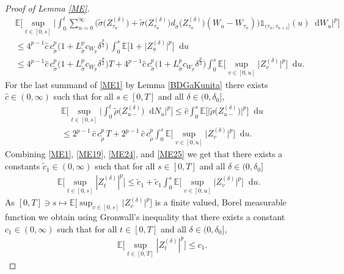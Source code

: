 \documentclass[11pt,a4paper]{article}
\numberwithin{equation}{section}
\theoremstyle{definition}
\newcommand{\E}{{\mathbb{E}}}
\newcommand{\diff}{\mathop{}\!\mathrm{d}}
\begin{document}
\begin{proof}[Proof of Lemma \ref{ME}]
\begin{equation}
\begin{aligned}
    &\E\Big[\sup_{t\in[0,s]}\Big|\int_0^t \sum_{n=0}^{\infty} \Big(\widetilde \sigma\big(Z^{(\delta)}_{\tau_{n}}\big) + \widetilde\sigma \big(Z^{(\delta)}_{\tau_n}\big) d_{\widetilde\sigma} \big(Z^{(\delta)}_{\tau_n}\big) (W_{u}-W_{\tau_n}) \Big)\mathds{1}_{(\tau_n,\tau_{n+1}]}(u) \diff W_u\Big|^p\Big]\\
    &\leq 4^{p-1} \hat c\, c_{\widetilde \sigma}^p \big( 1
    + L_{\widetilde\sigma}^p c_{W_p} \delta^{\frac{p}{2}}\big)  \, \int_0^s \E\big[ 1+ \big|Z^{(\delta)}_{\underline u}\big|^p\big]  \diff u\\
    &\leq  4^{p-1} \hat c\, c_{\widetilde \sigma}^p \big( 1
    + L_{\widetilde\sigma}^p c_{W_p} \delta^{\frac{p}{2}}\big)  T +  4^{p-1} \hat c\, c_{\widetilde \sigma}^p \big( 1
    + L_{\widetilde\sigma}^p c_{W_p} \delta^{\frac{p}{2}}\big) \int_0^s\E\Big[ \sup_{v\in[0,u]}  \big|Z^{(\delta)}_{v}\big|^p\Big]\diff u.
\end{aligned}
\end{equation}
For the last summand of \eqref{ME1} by Lemma \ref{BDGaKunita} there exists $\hat c \in(0,\infty)$ such that for all $s\in[0,T]$ and all $\delta\in(0,\delta_0]$,
\begin{equation}
    \begin{aligned}\label{ME25}
    &\E\Big[\sup_{t\in[0,s]}\Big|\int_0^t \widetilde \rho\big(Z^{(\delta)}_{u-}\big)\diff N_u\Big|^p\Big] 
    \leq \hat c \int_0^s \E\Big[\big| \widetilde \rho\big(Z^{(\delta)}_{u-}\big)\big|^p\Big]\diff u\\
    &\leq 2^{p-1} \,\hat c\, c_{\widetilde\rho}^p\, T + 2^{p-1} \,\hat c\, c_{\widetilde\rho}^p \int_0^s \E\Big[ \sup_{v\in[0,u]}\big|Z^{(\delta)}_{v}\big|^p\Big]\diff u.
\end{aligned}
\end{equation}
Combining \eqref{ME1}, \eqref{ME19}, \eqref{ME24}, and \eqref{ME25} we get that there exists a constants $\widetilde c_1 \in(0,\infty)$ such that for all $s\in[0,T]$ and all $\delta\in(0,\delta_0]$
\begin{equation}
    \begin{aligned}\label{ME26}
    \E\Big[\sup_{t\in[0,s]} |Z^{(\delta)}_{t}|^p\Big] 
    \leq \widetilde c_1 + \widetilde c_1 \int_0^s \E\Big[ \sup_{v\in[0,u]}\big|Z^{(\delta)}_{v}\big|^p\Big]\diff u. 
    \end{aligned}
\end{equation}
As $[0,T] \ni s \mapsto \E\big[ \sup_{v\in[0,s]}\big|Z^{(\delta)}_{v}\big|^p\big]$ is a finite valued, Borel measurable function we obtain using Gronwall's inequality that there exists a constant $c_1\in(0,\infty)$ such that for all $t\in[0,T]$ and all $\delta\in(0,\delta_0]$,
\begin{equation}
    \begin{aligned}\label{ME27}
    &\E\Big[\sup_{t\in[0,T]} |Z^{(\delta)}_{t}|^p\Big] \leq c_1.
    \end{aligned}
\end{equation}


\end{proof}
\end{document}
